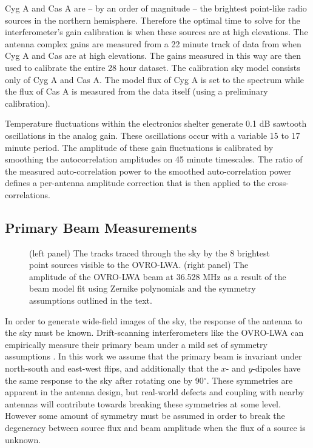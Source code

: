 \documentclass[twocolumn]{aastex61}
\begin{document}
Cyg A and Cas A are -- by an order of magnitude -- the brightest point-like radio sources in the
northern hemisphere. Therefore the optimal time to solve for the interferometer's gain calibration
is when these sources are at high elevations.  The antenna complex gains are measured from a 22
minute track of data from when Cyg A and Cas are at high elevations. The gains measured in this way
are then used to calibrate the entire 28 hour dataset. The calibration sky model consists only of
Cyg A and Cas A. The model flux of Cyg A is set to the \citet{1977A&A....61...99B} spectrum while
the flux of Cas A is measured from the data itself (using a preliminary calibration).

Temperature fluctuations within the electronics shelter generate 0.1 dB sawtooth oscillations in the
analog gain. These oscillations occur with a variable 15 to 17 minute period. The amplitude of these
gain fluctuations is calibrated by smoothing the autocorrelation amplitudes on 45 minute timescales.
The ratio of the measured auto-correlation power to the smoothed auto-correlation power defines a
per-antenna amplitude correction that is then applied to the cross-correlations.

\subsection{Primary Beam Measurements}

\begin{figure*}[ht]
    \caption{
        (left panel) The tracks traced through the sky by the 8 brightest point sources visible to the
        OVRO-LWA.
        (right panel) The amplitude of the OVRO-LWA beam at 36.528 MHz as a result of the beam model
        fit using Zernike polynomials and the symmetry assumptions outlined in the text.
    }
    \label{fig:beam}
\end{figure*}

In order to generate wide-field images of the sky, the response of the antenna to the sky must be
known. Drift-scanning interferometers like the OVRO-LWA can empirically measure their
primary beam under a mild set of symmetry assumptions \citep{2012AJ....143...53P}. In this work we
assume that the primary beam is invariant under north-south and east-west flips, and additionally
that the $x$- and $y$-dipoles have the same response to the sky after rotating one by 90$^\circ$.
These symmetries are apparent in the antenna design, but real-world defects and coupling with nearby
antennas will contribute towards breaking these symmetries at some level. However some amount of
symmetry must be assumed in order to break the degeneracy between source flux and beam amplitude
when the flux of a source is unknown.
\end{document}
